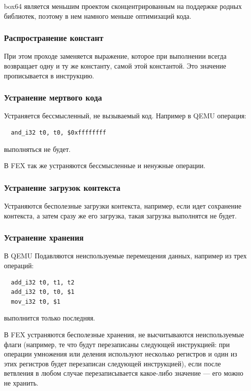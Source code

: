 box64 является меньшим проектом сконцентрированным на поддержке родных библиотек, поэтому в нем намного меньше оптимизаций кода.

\subsubsection{Распространение констант}

При этом проходе заменяется выражение, которое при выполнении всегда возвращает одну и ту же константу, самой этой константой. Это значение прописывается в инструкцию.

\subsubsection{Устранение мертвого кода}

Устраняется бессмысленный, не вызываемый код.
Например в QEMU операция:
\begin{Verbatim}
  and_i32 t0, t0, $0xffffffff
\end{Verbatim}
выполняться не будет.

В FEX так же устраняются бессмысленные и ненужные операции.

\subsubsection{Устранение загрузок контекста}

Устраняются бесполезные загрузки контекста, например, если идет сохранение контекста, а затем сразу же его загрузка, такая загрузка выполнятся не будет. 

\subsubsection{Устранение хранения}

В QEMU Подавляются неиспользуемые перемещения данных, например из трех операций:
\begin{Verbatim}
  add_i32 t0, t1, t2
  add_i32 t0, t0, $1
  mov_i32 t0, $1
\end{Verbatim}
выполнится только последняя.

В FEX устраняются бесполезные хранения, не высчитываются неиспользуемые флаги (например, те что будут перезаписаны следующей инструкцией: при операции умножения или деления используют несколько регистров и один из этих регистров будет перезаписан следующей инструкцией), если после ветвления в любом случае перезаписывается какое-либо значение --- его можно не хранить.

